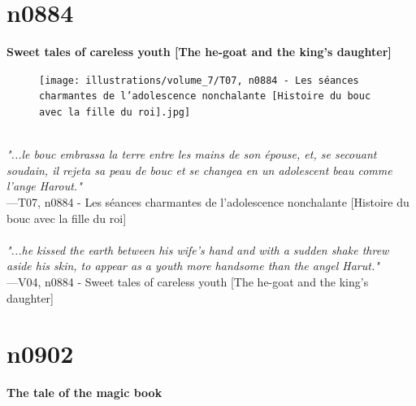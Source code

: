 \documentclass[../Carre_nights.tex]{subfiles}
\begin{document}
\section{n0884}
\textbf{\Large{Sweet tales of careless youth [The he-goat and the king's daughter]}} \\

\begin{figure}[ht]
\centering
\texttt{[image: illustrations/volume\_7/T07, n0884 - Les séances charmantes de l'adolescence nonchalante [Histoire du bouc avec la fille du roi].jpg]}
\end{figure}

\textit{\\
"...le bouc embrassa la terre entre les mains de son épouse, et, se secouant soudain, il rejeta sa peau de bouc et se changea en un adolescent beau comme l’ange Harout."} \\
—T07, n0884 - Les séances charmantes de l'adolescence nonchalante [Histoire du bouc avec la fille du roi] \\~\\
\textit{"...he kissed the earth between his wife's hand and with a sudden shake threw aside his skin, to appear as a youth more handsome than the angel Harut."} \\
—V04, n0884 - Sweet tales of careless youth [The he-goat and the king's daughter]

\newpage

\section{n0902}
\textbf{\Large{The tale of the magic book}} \\
\end{document}
